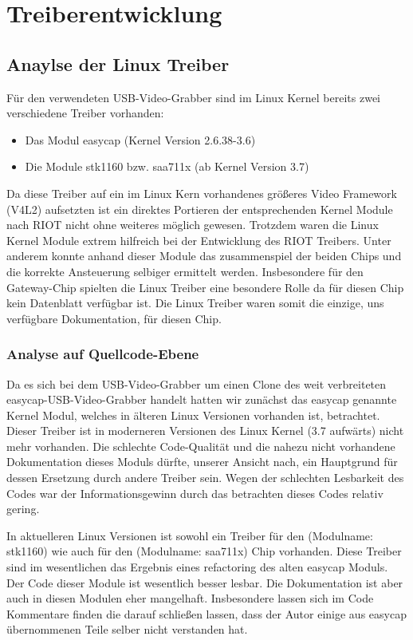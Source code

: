 \section{Treiberentwicklung}
\subsection{Anaylse der Linux Treiber}
Für den verwendeten USB-Video-Grabber sind im Linux Kernel bereits zwei 
verschiedene Treiber vorhanden:
\begin{itemize}
 \item Das Modul easycap (Kernel Version 2.6.38-3.6)
 \item Die Module stk1160 bzw. saa711x (ab Kernel Version 3.7)
\end{itemize}
Da diese Treiber auf ein im Linux Kern 
vorhandenes größeres Video Framework (V4L2) aufsetzten ist ein direktes Portieren der 
entsprechenden Kernel Module nach RIOT nicht ohne weiteres möglich gewesen.
Trotzdem waren die Linux Kernel Module extrem hilfreich bei der Entwicklung
des RIOT Treibers. Unter anderem konnte anhand dieser Module das zusammenspiel
der beiden Chips und die korrekte Ansteuerung selbiger ermittelt werden.
Insbesondere für den Gateway-Chip \stk{} spielten die Linux Treiber eine
besondere Rolle da für diesen Chip kein Datenblatt verfügbar ist. Die Linux 
Treiber waren somit die einzige, uns verfügbare Dokumentation, für diesen Chip. 

\subsubsection{Analyse auf Quellcode-Ebene}
Da es sich bei dem USB-Video-Grabber um einen Clone des weit verbreiteten
easycap-USB-Video-Grabber handelt hatten wir zunächst das easycap genannte Kernel
Modul, welches in älteren Linux Versionen vorhanden ist, betrachtet. Dieser Treiber
ist in moderneren Versionen des Linux Kernel (3.7 aufwärts) nicht mehr vorhanden.
Die schlechte Code-Qualität und die nahezu nicht vorhandene Dokumentation dieses Moduls dürfte, unserer Ansicht nach, ein Hauptgrund für dessen Ersetzung durch andere Treiber sein. Wegen der schlechten Lesbarkeit des
Codes war der Informationsgewinn durch das betrachten dieses Codes relativ gering.

In aktuelleren Linux Versionen ist sowohl ein Treiber für den \stk{} (Modulname: stk1160) 
wie auch für den \saa{} (Modulname: saa711x) Chip vorhanden. Diese Treiber sind im wesentlichen 
das Ergebnis eines refactoring des alten easycap Moduls. Der Code dieser Module ist wesentlich 
besser lesbar. Die Dokumentation ist aber auch in diesen Modulen eher mangelhaft. Insbesondere 
lassen sich im Code Kommentare finden die darauf schließen lassen, dass der Autor einige aus easycap übernommenen Teile selber nicht verstanden hat.

